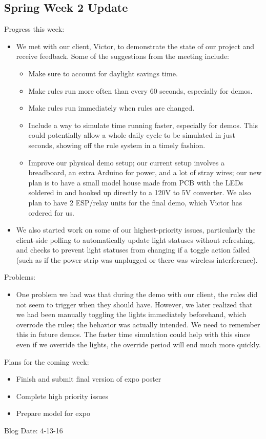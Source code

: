 \subsection{Spring Week 2 Update}
Progress this week:
\begin{itemize}
   \item We met with our client, Victor, to demonstrate the state of our project and receive feedback.  Some of the suggestions from the meeting include:
      \begin{itemize}
         \item Make sure to account for daylight savings time.
         \item Make rules run more often than every 60 seconds, especially for demos.
         \item Make rules run immediately when rules are changed.
         \item Include a way to simulate time running faster, especially for demos.  This could potentially allow a whole daily cycle to be simulated in just seconds, showing off the rule system in a timely fashion.
         \item Improve our physical demo setup; our current setup involves a breadboard, an extra Arduino for power, and a lot of stray wires; our new plan is to have a small model house made from PCB with the LEDs soldered in and hooked up directly to a 120V to 5V converter.  We also plan to have 2 ESP/relay units for the final demo, which Victor has ordered for us.
      \end{itemize}
   \item We also started work on some of our highest-priority issues, particularly the client-side polling to automatically update light statuses without refreshing, and checks to prevent light statuses from changing if a toggle action failed (such as if the power strip was unplugged or there was wireless interference).
\end{itemize}
Problems:
\begin{itemize}
   \item One problem we had was that during the demo with our client, the rules did not seem to trigger when they should have.  However, we later realized that we had been manually toggling the lights immediately beforehand, which overrode the rules; the behavior was actually intended.  We need to remember this in future demos.  The faster time simulation could help with this since even if we override the lights, the override period will end much more quickly.
\end{itemize}
Plans for the coming week:
\begin{itemize}
   \item Finish and submit final version of expo poster
   \item Complete high priority issues
   \item Prepare model for expo
\end{itemize}
Blog Date: 4-13-16

